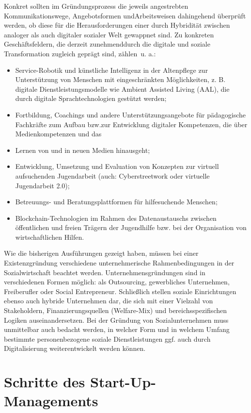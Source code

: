 \documentclass[
  letterpaper,
]{book}
\begin{document}
Konkret sollten im Gründungsprozess die jeweils angestrebten
Kommunikationswege, Angebotsformen undArbeitsweisen dahingehend
überprüft werden, ob diese für die Herausforderungen einer durch
Hybridität zwischen analoger als auch digitaler sozialer Welt gewappnet
sind. Zu konkreten Geschäftsfeldern, die derzeit zunehmenddurch die
digitale und soziale Transformation zugleich geprägt sind, zählen~u. a.:

\begin{itemize}
\item
  Service-Robotik und künstliche Intelligenz in der Altenpflege zur
  Unterstützung von Menschen mit eingeschränkten Möglichkeiten, z. B.
  digitale Dienstleistungsmodelle wie Ambient Assisted Living (AAL), die
  durch digitale Sprachtechnologien gestützt werden;
\item
  Fortbildung, Coachings und andere Unterstützungsangebote für
  pädagogische Fachkräfte zum Aufbau bzw.zur Entwicklung digitaler
  Kompetenzen, die über Medienkompetenzen und das
\item
  Lernen von und in neuen Medien hinausgeht;
\item
  Entwicklung, Umsetzung und Evaluation von Konzepten zur virtuell
  aufsuchenden Jugendarbeit (auch: Cyberstreetwork oder virtuelle
  Jugendarbeit 2.0);
\item
  Betreuungs- und Beratungsplattformen für hilfesuchende Menschen;
\item
  Blockchain-Technologien im Rahmen des Datenaustauschs zwischen
  öffentlichen und freien Trägern der Jugendhilfe bzw. bei der
  Organisation von wirtschaftlichen Hilfen.
\end{itemize}

Wie die bisherigen Ausführungen gezeigt haben, müssen bei einer
Existenzgründung verschiedene unternehmerische Rahmenbedingungen in der
Sozialwirtschaft beachtet werden. Unternehmensgründungen sind in
verschiedenen Formen möglich: als Outsourcing, gewerbliches Unternehmen,
Freiberufler oder Social Entrepreneur. Schließlich stellen soziale
Einrichtungen ebenso auch hybride Unternehmen dar, die sich mit einer
Vielzahl von Stakeholdern, Finanzierungsquellen (Welfare-Mix) und
bereichsspezifischen Logiken auseinandersetzen. Bei der Gründung von
Sozialunternehmen muss unmittelbar auch bedacht werden, in welcher Form
und in welchem Umfang bestimmte personenbezogene soziale
Dienstleistungen ggf. auch durch Digitalisierung weiterentwickelt werden
können.

\section{Schritte des Start-Up-Managements}\label{schritte-startup}
\end{document}
